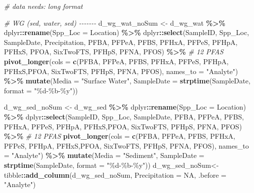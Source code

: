 \documentclass[
]{article}
\newenvironment{Shaded}{\begin{snugshade}}{\end{snugshade}}
\newcommand{\AttributeTok}[1]{\textcolor[rgb]{0.13,0.29,0.53}{#1}}
\newcommand{\CommentTok}[1]{\textcolor[rgb]{0.56,0.35,0.01}{\textit{#1}}}
\newcommand{\ConstantTok}[1]{\textcolor[rgb]{0.56,0.35,0.01}{#1}}
\newcommand{\FunctionTok}[1]{\textcolor[rgb]{0.13,0.29,0.53}{\textbf{#1}}}
\newcommand{\NormalTok}[1]{#1}
\newcommand{\OtherTok}[1]{\textcolor[rgb]{0.56,0.35,0.01}{#1}}
\newcommand{\SpecialCharTok}[1]{\textcolor[rgb]{0.81,0.36,0.00}{\textbf{#1}}}
\newcommand{\StringTok}[1]{\textcolor[rgb]{0.31,0.60,0.02}{#1}}
\begin{document}
\begin{Shaded}
\begin{Highlighting}[]
\CommentTok{\# data needs: long format }

\CommentTok{\# WG (sed, water, sed) {-}{-}{-}{-}{-}{-}{-}}
\NormalTok{d\_wg\_wat\_noSum }\OtherTok{\textless{}{-}}\NormalTok{ d\_wg\_wat }\SpecialCharTok{\%\textgreater{}\%}
\NormalTok{  dplyr}\SpecialCharTok{::}\FunctionTok{rename}\NormalTok{(}\AttributeTok{Spp\_Loc =}\NormalTok{ Location) }\SpecialCharTok{\%\textgreater{}\%}
\NormalTok{  dplyr}\SpecialCharTok{::}\FunctionTok{select}\NormalTok{(SampleID, Spp\_Loc, SampleDate, Precipitation,}
\NormalTok{                PFBA, PFPeA, PFBS, PFHxA, PFPeS,}
\NormalTok{                PFHpA, PFHxS, PFOA, SixTwoFTS,}
\NormalTok{                PFHpS, PFNA, PFOS) }\SpecialCharTok{\%\textgreater{}\%} \CommentTok{\# 12 PFAS}
  \FunctionTok{pivot\_longer}\NormalTok{(}\AttributeTok{cols =} \FunctionTok{c}\NormalTok{(PFBA, PFPeA, PFBS, PFHxA, PFPeS,}
\NormalTok{         PFHpA, PFHxS,PFOA, SixTwoFTS, PFHpS, PFNA, PFOS),}
         \AttributeTok{names\_to =} \StringTok{"Analyte"}\NormalTok{) }\SpecialCharTok{\%\textgreater{}\%}
  \FunctionTok{mutate}\NormalTok{(}\AttributeTok{Media =} \StringTok{"Surface Water"}\NormalTok{,}
         \AttributeTok{SampleDate =} \FunctionTok{strptime}\NormalTok{(SampleDate, }\AttributeTok{format =} \StringTok{"\%d{-}\%b{-}\%y"}\NormalTok{))}

\NormalTok{d\_wg\_sed\_noSum }\OtherTok{\textless{}{-}}\NormalTok{ d\_wg\_sed }\SpecialCharTok{\%\textgreater{}\%}
\NormalTok{  dplyr}\SpecialCharTok{::}\FunctionTok{rename}\NormalTok{(}\AttributeTok{Spp\_Loc =}\NormalTok{ Location) }\SpecialCharTok{\%\textgreater{}\%}
\NormalTok{  dplyr}\SpecialCharTok{::}\FunctionTok{select}\NormalTok{(SampleID, Spp\_Loc, SampleDate, PFBA, PFPeA, PFBS, PFHxA, PFPeS,}
\NormalTok{         PFHpA, PFHxS,PFOA, SixTwoFTS, PFHpS, PFNA, PFOS) }\SpecialCharTok{\%\textgreater{}\%} \CommentTok{\# 12 PFAS}
  \FunctionTok{pivot\_longer}\NormalTok{(}\AttributeTok{cols =} \FunctionTok{c}\NormalTok{(PFBA, PFPeA, PFBS, PFHxA, PFPeS,}
\NormalTok{         PFHpA, PFHxS,PFOA, SixTwoFTS, PFHpS, PFNA, PFOS),}
         \AttributeTok{names\_to =} \StringTok{"Analyte"}\NormalTok{) }\SpecialCharTok{\%\textgreater{}\%}
  \FunctionTok{mutate}\NormalTok{(}\AttributeTok{Media =} \StringTok{"Sediment"}\NormalTok{,}
         \AttributeTok{SampleDate =} \FunctionTok{strptime}\NormalTok{(SampleDate, }\AttributeTok{format =} \StringTok{"\%d{-}\%b{-}\%y"}\NormalTok{))}
\NormalTok{d\_wg\_sed\_noSum}\OtherTok{\textless{}{-}}\NormalTok{tibble}\SpecialCharTok{::}\FunctionTok{add\_column}\NormalTok{(d\_wg\_sed\_noSum, }\AttributeTok{Precipitation =} \ConstantTok{NA}\NormalTok{, }\AttributeTok{.before =} \StringTok{"Analyte"}\NormalTok{)}


\end{Highlighting}
\end{Shaded}
\end{document}
